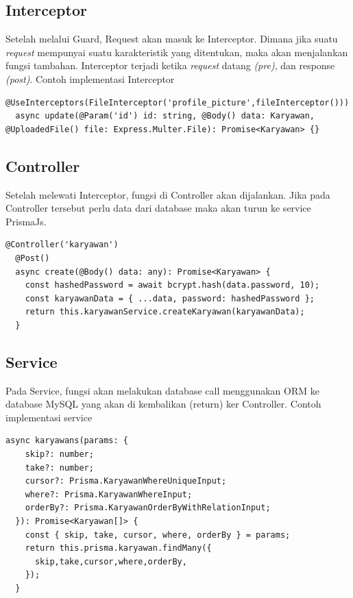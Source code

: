 \subsection{Interceptor}
Setelah melalui Guard, Request akan masuk ke Interceptor. Dimana jika suatu \textit{request} mempunyai suatu karakteristik yang ditentukan, maka akan menjalankan fungsi tambahan. Interceptor terjadi ketika \textit{request} datang \textit{(pre)}, dan response \textit{(post)}. Contoh implementasi Interceptor
\begin{lstlisting}[caption={Interceptor},label={lst:interceptor}]
  @UseInterceptors(FileInterceptor('profile_picture',fileInterceptor()))
  async update(@Param('id') id: string, @Body() data: Karyawan, @UploadedFile() file: Express.Multer.File): Promise<Karyawan> {}
\end{lstlisting}

\subsection{Controller}
Setelah melewati Interceptor, fungsi di Controller akan dijalankan. Jika pada Controller tersebut perlu data dari database maka akan turun ke service PrismaJs.
\begin{lstlisting}[caption={Controller},label={lst:controller}]
  @Controller('karyawan')
  @Post()
  async create(@Body() data: any): Promise<Karyawan> {
    const hashedPassword = await bcrypt.hash(data.password, 10);
    const karyawanData = { ...data, password: hashedPassword };
    return this.karyawanService.createKaryawan(karyawanData);
  }
\end{lstlisting}

\subsection{Service}
Pada Service, fungsi akan melakukan database call menggunakan ORM ke database MySQL yang akan di kembalikan (return) ker Controller\cite{NestJS}. Contoh implementasi service
\begin{lstlisting}[caption={Service},label={lst:service}]
  async karyawans(params: {
    skip?: number;
    take?: number;
    cursor?: Prisma.KaryawanWhereUniqueInput;
    where?: Prisma.KaryawanWhereInput;
    orderBy?: Prisma.KaryawanOrderByWithRelationInput;
  }): Promise<Karyawan[]> {
    const { skip, take, cursor, where, orderBy } = params;
    return this.prisma.karyawan.findMany({
      skip,take,cursor,where,orderBy,
    });
  }
\end{lstlisting}


